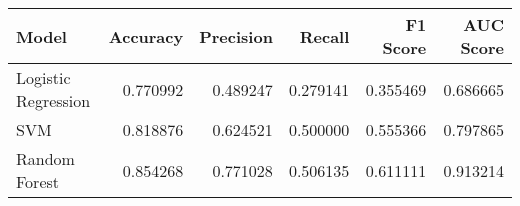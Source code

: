 \begin{tabular}{lrrrrr}
\toprule
Model & Accuracy & Precision & Recall & F1 Score & AUC Score \\
\midrule
Logistic Regression & 0.770992 & 0.489247 & 0.279141 & 0.355469 & 0.686665 \\
SVM & 0.818876 & 0.624521 & 0.500000 & 0.555366 & 0.797865 \\
Random Forest & 0.854268 & 0.771028 & 0.506135 & 0.611111 & 0.913214 \\
\bottomrule
\end{tabular}
